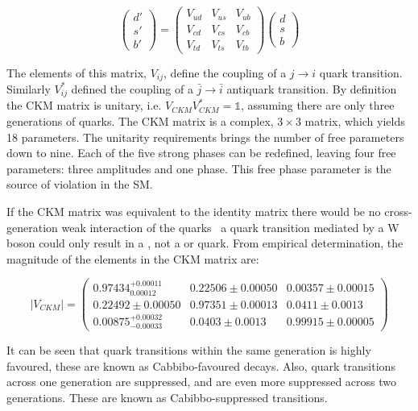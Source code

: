 \begin{equation}
\left(
\begin{array}{c} d' \\ s' \\ b'  \end{array} \right) =
\begin{pmatrix} V_{ud} & V_{us} & V_{ub} \\ V_{cd} & V_{cs} & V_{cb} \\ V_{td} & V_{ts} & V_{tb} \end{pmatrix} \left( 
\begin{array}{c} d \\ s \\ b \end{array} \right)
\label{CKMmatrix}
\end{equation}

The elements of this matrix, $V_{ij}$, define the coupling of a $j \to i$ quark transition. Similarly $V_{ij}^*$ defined the coupling of a $\bar{j} \to \bar{i}$ antiquark transition. By definition the CKM matrix is unitary, i.e. $V_{CKM}V_{CKM}^* = \mathds{1}$, assuming there are only three generations of quarks. The CKM matrix is a complex, $3 \times 3$ matrix, which yields 18 parameters. The unitarity requirements brings the number of free parameters down to nine. Each of the five strong phases can be redefined, leaving four free parameters: three amplitudes and one phase. This free phase parameter is the source of \CP violation in the SM.

If the CKM matrix was equivalent to the identity matrix there would be no cross-generation weak interaction of the quarks \eg\ a \uquark quark transition mediated by a W boson could only result in a \dquark, not a \squark or \bquark quark. From empirical determination, the magnitude of the elements in the CKM matrix are:

\begin{equation}
| V_{CKM} | = \begin{pmatrix} 0.97434^{+0.00011}_{0.00012} & 0.22506 \pm 0.00050 & 0.00357 \pm 0.00015 \\ 0.22492 \pm 0.00050 & 0.97351 \pm 0.00013 & 0.0411 \pm 0.0013 \\ 0.00875^{+0.00032}_{-0.00033} & 0.0403 \pm 0.0013 & 0.99915 \pm 0.00005 \end{pmatrix}
\end{equation}

It can be seen that quark transitions within the same generation is highly favoured, these are known as Cabbibo-favoured decays. Also, quark transitions across one generation are suppressed, and are even more suppressed across two generations. These are known as Cabibbo-suppressed transitions.

